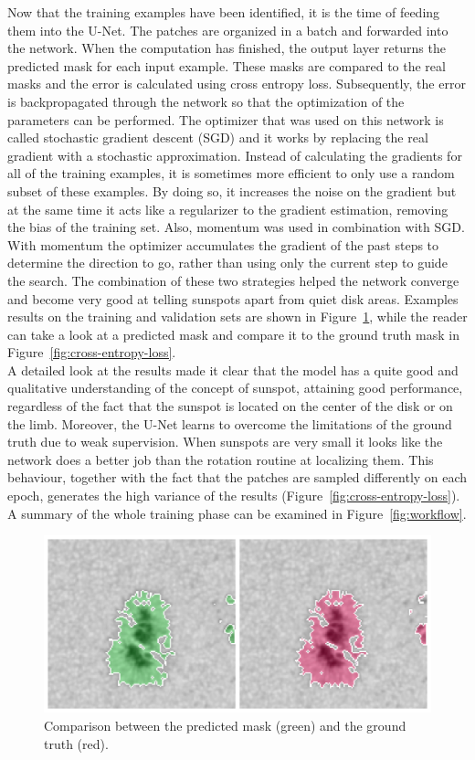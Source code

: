 Now that the training examples have been identified, it is the time of feeding them into the U-Net. The patches are organized in a batch and forwarded into the network. When the computation has finished, the output layer returns the predicted mask for each input example. These masks are compared to the real masks and the error is calculated using cross entropy loss. Subsequently, the error is backpropagated through the network so that the optimization of the parameters can be performed. The optimizer that was used on this network is called stochastic gradient descent (SGD) and it works by replacing the real gradient with a stochastic approximation. Instead of calculating the gradients for all of the training examples, it is sometimes more efficient to only use a random subset of these examples. By doing so, it increases the noise on the gradient but at the same time it acts like a regularizer to the gradient estimation, removing the bias of the training set. Also, momentum was used in combination with SGD. With momentum the optimizer accumulates the gradient of the past steps to determine the direction to go, rather than using only the current step to guide the search. The combination of these two strategies helped the network converge and become very good at telling sunspots apart from quiet disk areas. Examples results on the training and validation sets are shown in Figure~\ref{fig:pred-vs-ground}, while the reader can take a look at a predicted mask and compare it to the ground truth mask in Figure~\ref{fig:cross-entropy-loss}.\\
A detailed look at the results made it clear that the model has a quite good and qualitative understanding of the concept of sunspot, attaining good performance, regardless of the fact that the sunspot is located on the center of the disk or on the limb. Moreover, the U-Net learns to overcome the limitations of the ground truth due to weak supervision. When sunspots are very small it looks like the network does a better job than the rotation routine at localizing them. This behaviour, together with the fact that the patches are sampled differently on each epoch, generates the high variance of the results (Figure~\ref{fig:cross-entropy-loss}).\\
A summary of the whole training phase can be examined in Figure~\ref{fig:workflow}.
\begin{figure}[ht!]
    \centering
    \captionsetup{justification=centering}
    \includegraphics[width=\textwidth]{./pictures/pred-vs-ground}
    \caption{Comparison between the predicted mask (green) and the ground truth (red).}
    \label{fig:pred-vs-ground}
\end{figure}
